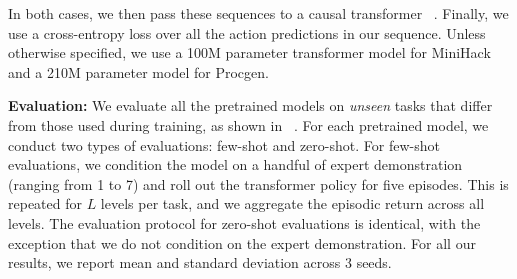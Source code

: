 In both cases, we then pass these sequences to a causal transformer ~\citep{vaswani2017attention}.  Finally, we use a cross-entropy loss over all the action predictions in our sequence. Unless otherwise specified, we use a 100M parameter transformer model for MiniHack and a 210M parameter model for Procgen.

\textbf{Evaluation:} We evaluate all the pretrained models on \textit{unseen} tasks that differ from those used during training, as shown in ~. For each pretrained model, we conduct two types of evaluations: few-shot and zero-shot. For few-shot evaluations, we condition the model on a handful of expert demonstration (ranging from 1 to 7) and roll out the transformer policy for five episodes. This is repeated for $L$ levels per task, and we aggregate the episodic return across all levels. The evaluation protocol for zero-shot evaluations is identical, with the exception that we do not condition on the expert demonstration. For all our results, we report mean and standard deviation across 3 seeds. 
